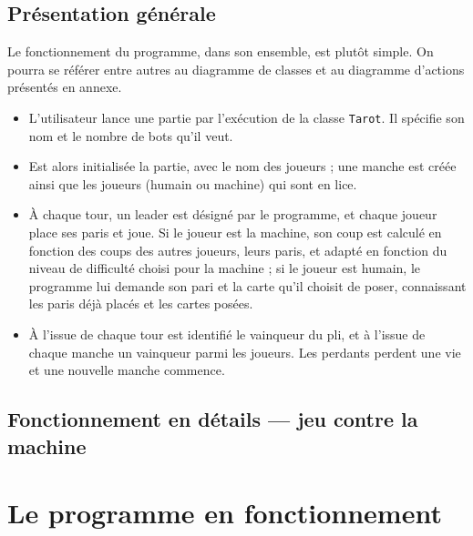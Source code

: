    \subsection{Présentation générale}\label{subsec:présentation-générale}
      Le fonctionnement du programme, dans son ensemble, est plutôt simple.
      On pourra se référer entre autres au diagramme de classes et au diagramme d'actions présentés en annexe.
      \begin{itemize}
         \item L'utilisateur lance une partie par l'exécution de la classe \texttt{Tarot}.
         Il spécifie son nom et le nombre de bots qu'il veut.
         \item Est alors initialisée la partie, avec le nom des joueurs ;
         une manche est créée ainsi que les joueurs (humain ou machine) qui sont en lice.
         \item À chaque tour, un leader est désigné par le programme, et chaque joueur place ses paris et joue.
         Si le joueur est la machine, son coup est calculé en fonction des coups des autres joueurs, leurs paris, et adapté en fonction du niveau de difficulté choisi pour la machine ;
         si le joueur est humain, le programme lui demande son pari et la carte qu'il choisit de poser, connaissant les paris déjà placés et les cartes posées.
         \item À l'issue de chaque tour est identifié le vainqueur du pli, et à l'issue de chaque manche un vainqueur parmi les joueurs.
         Les perdants perdent une vie et une nouvelle manche commence.
      \end{itemize}


   \subsection{Fonctionnement en détails --- jeu contre la machine}\label{subsec:fonctionnement-en-détails-----jeu-contre-la-machine}


\section{Le programme en fonctionnement}\label{sec:le-programme-en-fonctionnement}

